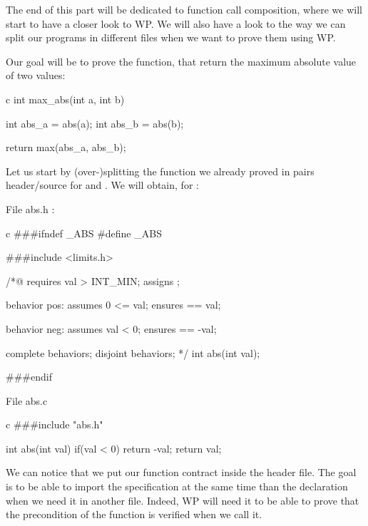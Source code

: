 The end of this part will be dedicated to function call composition,
where we will start to have a closer look to WP. We will also have a
look to the way we can split our programs in different files when we
want to prove them using WP.

Our goal will be to prove the  function, that return
the maximum absolute value of two values:



\begin{CodeBlock}{c}
int max_abs(int a, int b){
  int abs_a = abs(a);
  int abs_b = abs(b);

  return max(abs_a, abs_b);
}
\end{CodeBlock}


Let us start by (over-)splitting the function we already proved in pairs
header/source for  and . We will obtain, for
:



File abs.h :



\begin{CodeBlock}{c}
###ifndef _ABS
#define _ABS

###include <limits.h>

/*@
  requires val > INT_MIN;
  assigns  \nothing;

  behavior pos:
    assumes 0 <= val;
    ensures \result == val;
  
  behavior neg:
    assumes val < 0;
    ensures \result == -val;
 
  complete behaviors;
  disjoint behaviors;
*/
int abs(int val);

###endif
\end{CodeBlock}



File abs.c



\begin{CodeBlock}{c}
###include "abs.h"

int abs(int val){
  if(val < 0) return -val;
  return val;
}
\end{CodeBlock}



We can notice that we put our function contract inside the header file.
The goal is to be able to import the specification at the same time than
the declaration when we need it in another file. Indeed, WP will need it
to be able to prove that the precondition of the function is verified
when we call it.


